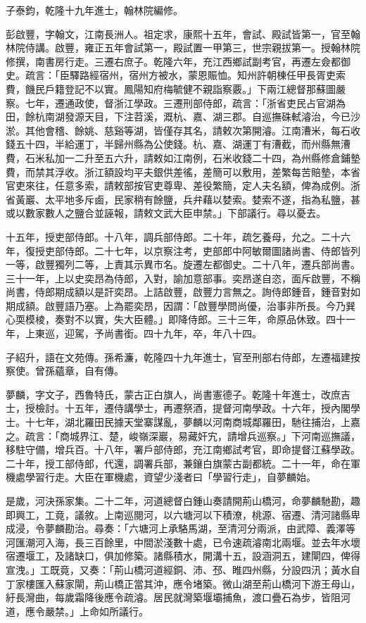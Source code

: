 \begin{pinyinscope}
子泰鈞，乾隆十九年進士，翰林院編修。

彭啟豐，字翰文，江南長洲人。祖定求，康熙十五年，會試、殿試皆第一，官至翰林院侍講。啟豐，雍正五年會試第一，殿試置一甲第三，世宗親拔第一。授翰林院修撰，南書房行走。三遷右庶子。乾隆六年，充江西鄉試副考官，再遷左僉都御史。疏言：「臣驛路經宿州，宿州方被水，蒙恩賑恤。知州許朝棟任甲長胥吏索費，饑民戶籍登記不以實。鳳陽知府梅毓健不親詣察覈。」下兩江總督那蘇圖嚴察。七年，遷通政使，督浙江學政。三遷刑部侍郎，疏言：「浙省吏民占官湖為田，餘杭南湖發源天目，下注苕溪，溉杭、嘉、湖三郡。自巡撫硃軾濬治，今已沙淤。其他會稽、餘姚、慈谿等湖，皆僅存其名，請敕次第開濬。江南漕米，每石收錢五十四，半給運丁，半歸州縣為公使錢。杭、嘉、湖運丁有漕截，而州縣無漕費，石米私加一二升至五六升，請敕如江南例，石米收錢二十四，為州縣修倉鋪墊費，而禁其浮收。浙江額設均平夫銀供差徭，差簡可以敷用，差繁每苦賠墊，本省官吏來往，任意多索，請敕部按官吏尊卑、差役繁簡，定人夫名額，俾為成例。浙省黃巖、太平地多斥鹵，民家稍有餘鹽，兵弁藉以婪索。婪索不遂，指為私鹽，甚或以數家數人之鹽合並誣報，請敕文武大臣申禁。」下部議行。尋以憂去。

十五年，授吏部侍郎。十八年，調兵部侍郎。二十年，疏乞養母，允之。二十六年，復授吏部侍郎。二十七年，以京察注考，吏部郎中阿敏爾圖諸尚書、侍郎皆列一等，啟豐獨列二等，上責其示異市名。旋遷左都御史。二十八年，遷兵部尚書。三十一年，上以史奕昂為侍郎，入對，諭加意部事。奕昂遂自恣，面斥啟豐，不稱尚書，侍郎期成額以是訐奕昂。上詰啟豐，啟豐力言無之。詢侍郎鍾音，鍾音對如期成額。啟豐語乃塞。上為罷奕昂，因謂：「啟豐學問尚優，治事非所長。今乃巽心耎模棱，奏對不以實，失大臣體。」即降侍郎。三十三年，命原品休致。四十一年，上東巡，迎駕，予尚書銜。四十九年，卒，年八十四。

子紹升，語在文苑傳。孫希濂，乾隆四十九年進士，官至刑部右侍郎，左遷福建按察使。曾孫蘊章，自有傳。

夢麟，字文子，西魯特氏，蒙古正白旗人，尚書憲德子。乾隆十年進士，改庶吉士，授檢討。十五年，遷侍講學士，再遷祭酒，提督河南學政。十六年，授內閣學士。十七年，湖北羅田民據天堂寨謀亂，夢麟以河南商城鄰羅田，馳往捕治，上嘉之。疏言：「商城界江、楚，峻嶺深巖，易藏奸宄，請增兵巡察。」下河南巡撫議，移駐守備，增兵百。十八年，署戶部侍郎，充江南鄉試考官，即命提督江蘇學政。二十年，授工部侍郎，代還，調署兵部，兼鑲白旗蒙古副都統。二十一年，命在軍機處學習行走。大臣在軍機處，資望少淺者曰「學習行走」，自夢麟始。

是歲，河決孫家集。二十二年，河道總督白鍾山奏請開荊山橋河，命夢麟馳勘，趣即興工，工竟，議敘。上南巡閱河，以六塘河以下積潦，桃源、宿遷、清河諸縣卑成浸，令夢麟勘治。尋奏：「六塘河上承駱馬湖，至清河分兩派，由武障、義澤等河匯潮河入海，長三百餘里，中間淤淺數十處，已令速疏濬南北兩堰。並去年水壞宿遷堰工，及諸缺口，俱加修築。諸縣積水，開溝十五，設涵洞五，建閘四，俾得宣洩。」工既竟，又奏：「荊山橋河道經銅、沛、邳、睢四州縣，分設四汛；黃水自丁家樓匯入蘇家閘，荊山橋正當其沖，應令堵築。微山湖至荊山橋河下游王母山，紆長灣曲，每歲霜降後應令疏濬。居民就灣築堰壩捕魚，渡口疊石為步，皆阻河道，應令嚴禁。」上命如所議行。


\end{pinyinscope}
